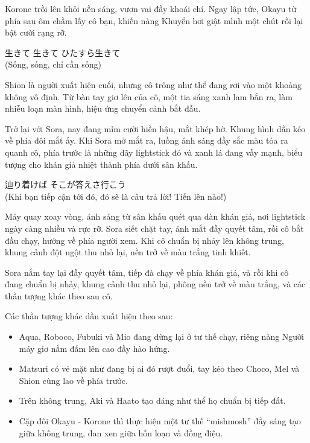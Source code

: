 \documentclass[../main.tex]{subfiles}
\begin{document}
\chrint

Korone trồi lên khỏi nền sáng, vươn vai đầy khoái chí. Ngay lập tức, Okayu từ phía sau ôm chầm lấy cô bạn, khiến nàng Khuyển hơi giật mình một chút rồi lại bật cười rạng rỡ.

\begin{center}
  生きて 生きて ひたすら生きて\\
  (Sống, sống, chỉ cần sống)
\end{center}

Shion là người xuất hiện cuối, nhưng cô trông như thể đang rơi vào một khoảng không vô định. Từ bàn tay giơ lên của cô, một tia sáng xanh lam bắn ra, làm nhiễu loạn màn hình, hiệu ứng chuyển cảnh bắt đầu.

Trở lại với Sora, nay đang mỉm cười hiền hậu, mắt khép hờ. Khung hình dần kéo về phía đôi mắt ấy. Khi Sora mở mắt ra, luồng ánh sáng đầy sắc màu tỏa ra quanh cô, phía trước là những dãy lightstick đỏ và xanh lá đang vẫy mạnh, biểu tượng cho khán giả nhiệt thành phía dưới sân khấu.

\begin{center}
  辿り着けば そこが答えさ行こう\\
  (Khi bạn tiếp cận tới đó, đó sẽ là câu trả lời! Tiến lên nào!)
\end{center}

Máy quay xoay vòng, ánh sáng từ sân khấu quét qua dàn khán giả, nơi lightstick ngày càng nhiều và rực rỡ. Sora siết chặt tay, ánh mắt đầy quyết tâm, rồi cô bắt đầu chạy, hướng về phía người xem. Khi cô chuẩn bị nhảy lên không trung, khung cảnh đột ngột thu nhỏ lại, nền trở về màu trắng tinh khiết.

Sora nắm tay lại đầy quyết tâm, tiếp đà chạy về phía khán giả, và rồi khi cô đang chuẩn bị nhảy, khung cảnh thu nhỏ lại, phông nền trở về màu trắng, và các thần tượng khác theo sau cô.

Các thần tượng khác dần xuất hiện theo sau:

\begin{itemize}
  \item Aqua, Roboco, Fubuki và Mio đang dừng lại ở tư thế chạy, riêng nàng Người máy giơ nắm đấm lên cao đầy hào hứng.
  \item Matsuri có vẻ mặt như đang bị ai đó rượt đuổi, tay kéo theo Choco, Mel và Shion cùng lao về phía trước.
  \item Trên không trung, Aki và Haato tạo dáng như thể họ chuẩn bị tiếp đất.
  \item Cặp đôi Okayu - Korone thì thực hiện một tư thế ``mishmosh'' đầy sáng tạo giữa không trung, đan xen giữa hỗn loạn và đồng điệu.
\end{itemize}
\end{document}
